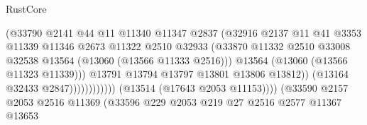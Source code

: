 \begin{lexlean}{RustCore}
\begin{coremodule}
                                                  (@33790
                                                    @2141
                                                    @44
                                                    @11
                                                    @11340
                                                    @11347
                                                    @2837
                                                    (@32916
                                                      @2137
                                                      @11
                                                      @41
                                                      @3353
                                                      @11339
                                                      @11346
                                                      @2673
                                                      @11322
                                                      @2510
                                                      @32933
                                                      (@33870
                                                        @11332
                                                        @2510
                                                        @33008
                                                        @32538
                                                        @13564
                                                        (@13060 (@13566 @11333 @2516)))
                                                      @13564
                                                      (@13060 (@13566 @11323 @11339)))
                                                    @13791
                                                    @13794
                                                    @13797
                                                    @13801
                                                    @13806
                                                    @13812))
                                                (@13164 @32433 @2847))))))))))))
                          (@13514 (@17643 @2053 @11153))))
                      (@33590
                        @2157
                        @2053
                        @2516
                        @11369
                        (@33596
                          @229
                          @2053
                          @219
                          @27
                          @2516
                          @2577
                          @11367
                          @13653

\end{coremodule}
\end{lexlean}
